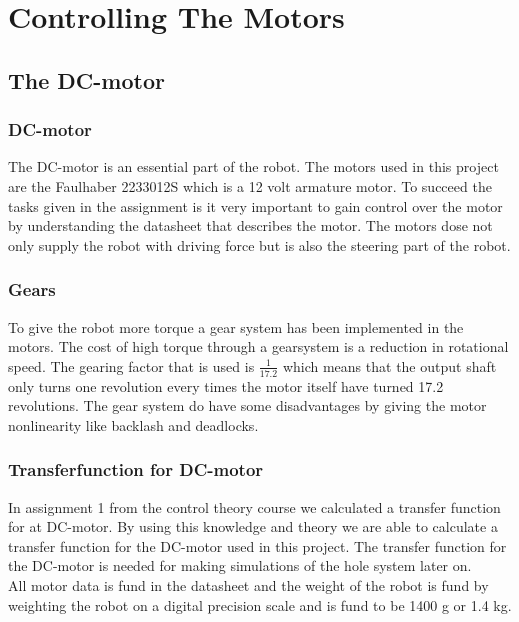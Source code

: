 \chapter{Controlling The Motors}
\label{ch:motors}





\section {The DC-motor}


\subsection{DC-motor}
The DC-motor is an essential part of the robot. The motors used in this project are the Faulhaber 2233012S which is a 12 volt armature motor.  To succeed the tasks given in the assignment is it very important to gain control over the motor by understanding the datasheet that describes the motor. The motors dose not only supply the robot with driving force but is also the steering part of the robot.

\subsection{Gears}
To give the robot more torque a gear system has been implemented in the motors. The cost of high torque through a gearsystem is a reduction in rotational speed. The gearing factor that is used is $\frac{1}{17.2}$ which means that the output shaft only turns one revolution every times the motor itself have turned 17.2 revolutions. The gear system do have some disadvantages by giving the motor nonlinearity like backlash and deadlocks. 

\subsection{Transferfunction for DC-motor}
In assignment 1 from the control theory course we calculated a transfer function for at DC-motor. By using this knowledge and theory we are able to calculate a transfer function for the DC-motor used in this project.
The transfer function for the DC-motor is needed for making simulations of the hole system later on.\\
All motor data is fund in the datasheet and the weight of the robot is fund by weighting the robot on a digital precision scale and is fund to be 1400 g or 1.4 kg. \\

